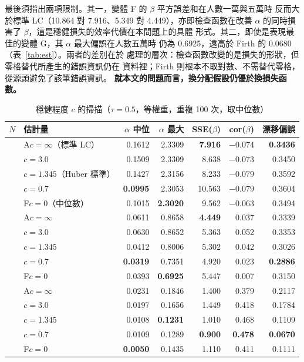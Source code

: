 \documentclass[UTF8, fontset=macnew, a4paper, 12pt]{ctexart}
\begin{document}
最後須指出兩項限制。其一，變體 F 的 $\beta$ 平方誤差和在人數一萬與五萬時
反而大於標準 LC（10.864 對 7.916、5.349 對 4.449），亦即檢查函數在改善
$\alpha$ 的同時損害了 $\beta$，這是穩健損失的效率代價在本問題上的具體
形式。其二，即使是表現最佳的變體 G，其 $\alpha$ 最大偏誤在人數五萬時
仍為 0.6925，遠高於 Firth 的 0.0680（表~\ref{tab:est}）。兩者的差別在於
處理的層次：檢查函數改變的是損失的形狀，但零格替代所產生的錯誤資訊仍在
資料裡；Firth 則根本不取對數、不需替代零格，從源頭避免了該筆錯誤資訊。
\textbf{就本文的問題而言，換分配假設仍優於換損失函數。}

\begin{table}[H]
\centering
\caption{穩健程度 $c$ 的掃描（$\tau=0.5$，等權重，重複 100 次，取中位數）}
\small
\begin{tabular}{llrrrrr}
\toprule
$N$ & 估計量 & $\alpha$ 中位 & $\alpha$ 最大 & SSE($\beta$) & cor($\beta$) & 漂移偏誤\\
\midrule
{}
 & A\quad $c=\infty$（標準 LC）  & 0.1612 & 2.3309 & \textbf{7.916} & $-0.074$ & \textbf{0.3436}\\
 & $c=3.0$                      & 0.1509 & 2.3309 & 8.638 & $-0.073$ & 0.3450\\
 & $c=1.345$（Huber 標準）      & 0.1427 & 2.3156 & 8.233 & $-0.079$ & 0.3592\\
 & $c=0.7$                      & \textbf{0.0995} & 2.3053 & 10.563 & $-0.079$ & 0.3604\\
 & F\quad $c=0$（中位數）        & 0.1015 & \textbf{2.3020} & 9.562 & $-0.063$ & 0.3494\\
\midrule
{}
 & A\quad $c=\infty$            & 0.0611 & 0.8658 & \textbf{4.449} & 0.037 & 0.3339\\
 & $c=3.0$                      & 0.0630 & 0.8652 & 5.363 & 0.052 & 0.3353\\
 & $c=1.345$                    & 0.0412 & 0.8006 & 5.302 & 0.042 & 0.3026\\
 & $c=0.7$                      & \textbf{0.0319} & 0.7351 & 4.920 & 0.023 & \textbf{0.2886}\\
 & F\quad $c=0$                 & 0.0393 & \textbf{0.6925} & 5.447 & 0.007 & 0.3150\\
\midrule
{}
 & A\quad $c=\infty$            & 0.0231 & 0.1846 & 1.400 & 0.379 & 0.2117\\
 & $c=3.0$                      & 0.0197 & 0.1656 & 1.449 & 0.418 & 0.1784\\
 & $c=1.345$                    & 0.0108 & \textbf{0.1231} & 1.010 & 0.468 & 0.1109\\
 & $c=0.7$                      & 0.0109 & 0.1289 & \textbf{0.900} & \textbf{0.478} & \textbf{0.0670}\\
 & F\quad $c=0$                 & \textbf{0.0050} & 0.1435 & 1.110 & 0.411 & 0.1111\\
\bottomrule
\end{tabular}
\label{tab:mqc}
\end{table}
\end{document}
